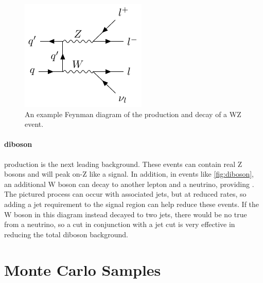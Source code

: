 \begin{centering}
\begin{figure}[bth]
\myfloatalign
\includegraphics[width=.70\linewidth]{feynman/diboson.pdf}
\caption{An example Feynman diagram of the production and decay of a WZ event.}
\label{fig:diboson}
\end{figure}
\end{centering}

\paragraph{diboson} production is the next leading background. These events can contain real Z bosons and will peak on-Z like a signal. In addition, in events like \autoref{fig:diboson}, an additional W boson can decay to another lepton and a neutrino, providing \MET. The pictured process can occur with associated jets, but at reduced rates, so adding a jet requirement to the signal region can help reduce these events. If the W boson in this diagram instead decayed to two jets, there would be no true \MET from a neutrino, so a \MET cut in conjunction with a jet cut is very effective in reducing the total diboson background. 

\section{Monte Carlo Samples} 